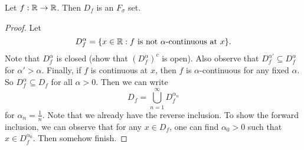 \begin{theorem}
  Let $f : \mathbb{R} \to \mathbb{R}$. Then $D_f$ is an $F_\sigma$ set.
\end{theorem}

\begin{proof}
  Let
  \[D^\alpha_f = \{x \in \mathbb{R} : \text{$f$ is not $\alpha$-continuous at $x$}\}.\]
  Note that $D^\alpha_f$ is closed (show that
  $(D^\alpha_f)^c$ is open). Also observe that
  $D^{\alpha'}_f \subseteq D^\alpha_f$ for
  $\alpha' > \alpha$. Finally, if $f$ is
  continuous at $x$, then $f$ is $\alpha$-continuous
  for any fixed $\alpha$. So $D^\alpha_f \subseteq D_f$
  for all $\alpha > 0$. Then we can write
  \[D_f = \bigcup_{n = 1}^\infty D^{\alpha_n}_f\]
  for $\alpha_n = \frac{1}{n}$. Note that we already
  have the reverse inclusion.
  To show the forward
  inclusion, we can observe that for any $x \in D_f$,
  one can find $\alpha_0 > 0$ such that
  $x \in D^{\alpha_0}_f$. Then somehow finish.
\end{proof}
